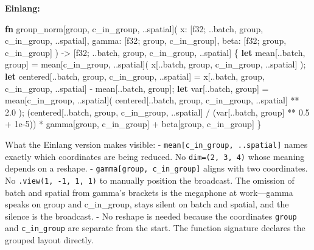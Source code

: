 \documentclass[11pt,titlepage]{article}
\newenvironment{Shaded}{}{}
\newcommand{\DataTypeTok}[1]{\textcolor[rgb]{0.56,0.13,0.00}{#1}}
\newcommand{\DecValTok}[1]{\textcolor[rgb]{0.25,0.63,0.44}{#1}}
\newcommand{\KeywordTok}[1]{\textcolor[rgb]{0.00,0.44,0.13}{\textbf{#1}}}
\newcommand{\NormalTok}[1]{#1}
\newcommand{\OperatorTok}[1]{\textcolor[rgb]{0.40,0.40,0.40}{#1}}
\begin{document}
\textbf{Einlang:}

\begin{Shaded}
\begin{Highlighting}[]
\KeywordTok{fn}\NormalTok{ group_norm[group, c_in_group, ..spatial](}
\NormalTok{    x: }\OperatorTok{[}\DataTypeTok{f32}\NormalTok{; ..batch, group, c_in_group, ..spatial}\OperatorTok{]}\NormalTok{,}
\NormalTok{    gamma: }\OperatorTok{[}\DataTypeTok{f32}\NormalTok{; group, c_in_group}\OperatorTok{]}\NormalTok{,}
\NormalTok{    beta: }\OperatorTok{[}\DataTypeTok{f32}\NormalTok{; group, c_in_group}\OperatorTok{]}
\NormalTok{) -> }\OperatorTok{[}\DataTypeTok{f32}\NormalTok{; ..batch, group, c_in_group, ..spatial}\OperatorTok{]}
\OperatorTok{\{}
    \KeywordTok{let}\NormalTok{ mean}\OperatorTok{[}\NormalTok{..batch, group}\OperatorTok{]}\NormalTok{ = mean}\OperatorTok{[}\NormalTok{c_in_group, ..spatial}\OperatorTok{]}\NormalTok{(}
\NormalTok{        x}\OperatorTok{[}\NormalTok{..batch, group, c_in_group, ..spatial}\OperatorTok{]}
\NormalTok{    );}
    \KeywordTok{let}\NormalTok{ centered}\OperatorTok{[}\NormalTok{..batch, group, c_in_group, ..spatial}\OperatorTok{]}\NormalTok{ =}
\NormalTok{        x}\OperatorTok{[}\NormalTok{..batch, group, c_in_group, ..spatial}\OperatorTok{]}\NormalTok{ - mean}\OperatorTok{[}\NormalTok{..batch, group}\OperatorTok{]}\NormalTok{;}
    \KeywordTok{let}\NormalTok{ var}\OperatorTok{[}\NormalTok{..batch, group}\OperatorTok{]}\NormalTok{ = mean}\OperatorTok{[}\NormalTok{c_in_group, ..spatial}\OperatorTok{]}\NormalTok{(}
\NormalTok{        centered}\OperatorTok{[}\NormalTok{..batch, group, c_in_group, ..spatial}\OperatorTok{]}\NormalTok{ ** }\DecValTok{2.0}
\NormalTok{    );}
\NormalTok{    (centered}\OperatorTok{[}\NormalTok{..batch, group, c_in_group, ..spatial}\OperatorTok{]}
\NormalTok{        / (var}\OperatorTok{[}\NormalTok{..batch, group}\OperatorTok{]}\NormalTok{ ** }\DecValTok{0.5}\NormalTok{ + }\DecValTok{1}\NormalTok{e-}\DecValTok{5}\NormalTok{))}
\NormalTok{        * gamma}\OperatorTok{[}\NormalTok{group, c_in_group}\OperatorTok{]}\NormalTok{ + beta}\OperatorTok{[}\NormalTok{group, c_in_group}\OperatorTok{]}
\OperatorTok{\}}
\end{Highlighting}
\end{Shaded}

What the Einlang version makes visible: -
\texttt{mean{[}c\_in\_group,\ ..spatial{]}} names exactly which
coordinates are being reduced. No \texttt{dim=(2,\ 3,\ 4)} whose meaning
depends on a reshape. - \texttt{gamma{[}group,\ c\_in\_group{]}} aligns
with two coordinates. No \texttt{.view(1,\ -1,\ 1,\ 1)} to manually
position the broadcast. The omission of batch and spatial from gamma's
brackets is the megaphone at work---gamma speaks on group and
c\_in\_group, stays silent on batch and spatial, and the silence is the
broadcast. - No reshape is needed because the coordinates \texttt{group}
and \texttt{c\_in\_group} are separate from the start. The function
signature declares the grouped layout directly.
\end{document}
